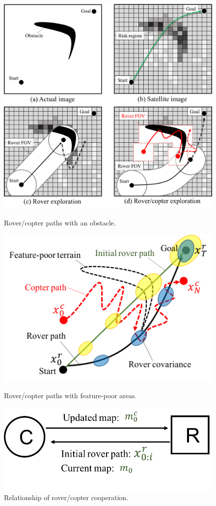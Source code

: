 \documentclass[conference]{IEEEtran}
\begin{document}
\begin{figure}[h]
		\centering
		\includegraphics[width=0.9\columnwidth]{figs/8_1.png}
		\caption{Rover/copter paths with an obstacle.}
		\label{fig:8_1}
		\vspace{5mm}
		\centering
		\includegraphics[width=0.6\columnwidth]{figs/8_2.png}
		\caption{Rover/copter paths with feature-poor areas.}
		\label{fig:8_2}
		\vspace{5mm}
		\centering
		\includegraphics[width=0.6\columnwidth]{figs/8_4.png}
		\caption{Relationship of rover/copter cooperation.}
		\label{fig:8_4}
\end{figure}
\end{document}
